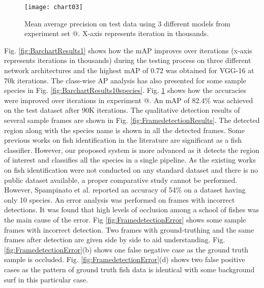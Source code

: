 \documentclass[conference]{IEEEtran}       %
\makeatletter
\newcommand*{\rom}[1]{\expandafter\@slowromancap\romannumeral #1@}
\makeatother
\begin{document}
\begin{figure}[!htb]
    \centering
      \texttt{[image: chart03]}
      \vspace{-1ex}
    \caption{Mean average precision on test data using 3 different models from experiment set  \rom{2}. X-axis represents iteration in thousands.}
   \label{fig:BarchartResults2}
   \vspace{-3ex}
\end{figure}
Fig. \ref{fig:BarchartResults1} shows how the mAP improves over iterations (x-axis represents iterations in thousands) during the testing process on three different network architectures and the highest mAP of 0.72 was obtained for VGG-16 at 70k iterations. The class-wise AP analysis has also presented for some sample species in Fig. \ref{fig:BarchartResults10species}.  Fig. \ref{fig:BarchartResults2} shows how the accuracies were improved over iterations in experiment \rom{2}. An mAP of 82.4\% was achieved on the test dataset after 90K iterations. 
The qualitative detection results of several sample frames are shown in Fig. \ref{fig:FramedetectionResults}. The detected region along with the species name is shown in all the detected frames. Some previous works on fish identification in the literature are significant as a fish classifier. However, our proposed system is more advanced as it detects the region of interest and classifies all the species in a single pipeline. As the existing works on fish identification were not conducted on any standard dataset and there is no public dataset available, a proper comparative study cannot be performed. However, Spampinato et al. \cite{Spampinato2016} reported an accuracy of 54\% on a dataset having only 10 species. 
An error analysis was performed on frames with incorrect detections. It was found that high levels of occlusion among a school of fishes was the main cause of the error.  Fig \ref{fig:FramedetectionError} shows some sample frames with incorrect detection. Two frames with ground-truthing and the same frames after detection are given side by side to aid understanding. Fig. \ref{fig:FramedetectionError}(b) shows one false negative case as the ground truth sample is occluded. Fig. \ref{fig:FramedetectionError}(d) shows two false positive cases as the pattern of ground truth fish data is identical with some background surf in this particular case.
\end{document}
